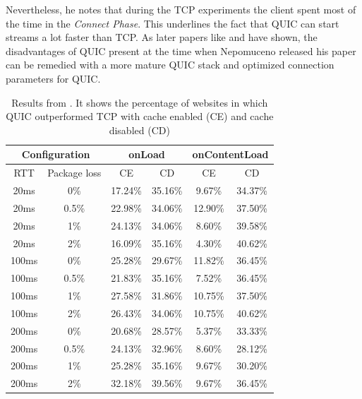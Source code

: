 \documentclass[conference]{IEEEtran}
\begin{document}
Nevertheless, he notes that during the TCP experiments the client spent most of the time in the \textit{Connect Phase}. This underlines the fact that QUIC can start streams a lot faster than TCP. As later papers like \cite{Kakhki} and \cite{Kernel} have shown, the disadvantages of QUIC present at the time when Nepomuceno released his paper can be remedied with a more mature QUIC stack and optimized connection parameters for QUIC.


\begin{table}
\begin{center}
\begin{tabular}{|cc|cc|cc|}
\hline

\multicolumn{2}{|c|}{\textbf{Configuration}} & 
\multicolumn{2}{|c|}{\textbf{onLoad}} & 
\multicolumn{2}{|c|}{\textbf{onContentLoad}} \\
\hline

RTT & Package loss & CE & CD & CE & CD \\
\hline

20ms  & 0\%   & 17.24\% & 35.16\% & 9.67\%  & 34.37\% \\
20ms  & 0.5\% & 22.98\% & 34.06\% & 12.90\% & 37.50\% \\
20ms  & 1\%   & 24.13\% & 34.06\% & 8.60\%  & 39.58\% \\
20ms  & 2\%   & 16.09\% & 35.16\% & 4.30\%  & 40.62\% \\
100ms & 0\%   & 25.28\% & 29.67\% & 11.82\% & 36.45\% \\
100ms & 0.5\% & 21.83\% & 35.16\% & 7.52\%  & 36.45\% \\
100ms & 1\%   & 27.58\% & 31.86\% & 10.75\% & 37.50\% \\
100ms & 2\%   & 26.43\% & 34.06\% & 10.75\% & 40.62\% \\
200ms & 0\%   & 20.68\% & 28.57\% & 5.37\%  & 33.33\% \\
200ms & 0.5\% & 24.13\% & 32.96\% & 8.60\%  & 28.12\% \\
200ms & 1\%   & 25.28\% & 35.16\% & 9.67\%  & 30.20\% \\
200ms & 2\%   & 32.18\% & 39.56\% & 9.67\%  & 36.45\% \\
\hline

\end{tabular}
\end{center}

\caption{Results from \cite{Nepomuceno}. It shows the percentage of websites in which QUIC outperformed TCP with cache enabled (CE) and cache disabled (CD)}
\label{table:nepomuceno-results}
\end{table}
\end{document}
